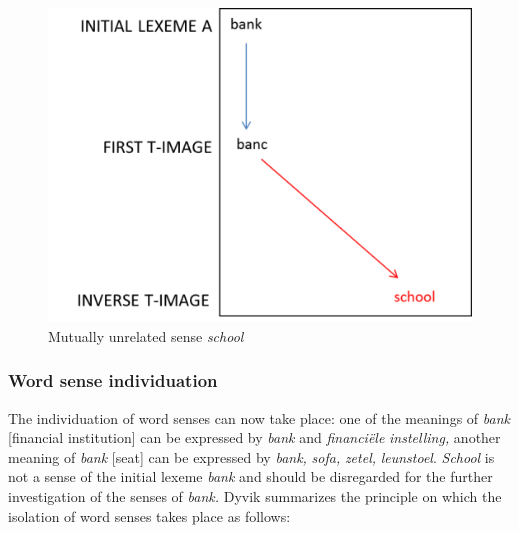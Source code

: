 \begin{figure}
\includegraphics[height=.3\textheight]{figures/Vandevoorde2-img13.png}
\caption{\label{fig:key:14}  Mutually unrelated sense \textit{school}}
\end{figure}

\subsubsection{\label{sec:3.4.3.4}  Word sense individuation}

The individuation of word senses can now take place: one of the meanings of \textit{bank} [financial institution] can be expressed by \textit{bank} and \textit{financiële} \textit{instelling,} another meaning of \textit{bank} [seat] can be expressed by \textit{bank,} \textit{sofa,} \textit{zetel,} \textit{leunstoel}. \textit{School} is not a sense of the initial lexeme \textit{bank} and should be disregarded for the further investigation of the senses of \textit{bank.} Dyvik summarizes the principle on which the isolation of word senses takes place as follows:


